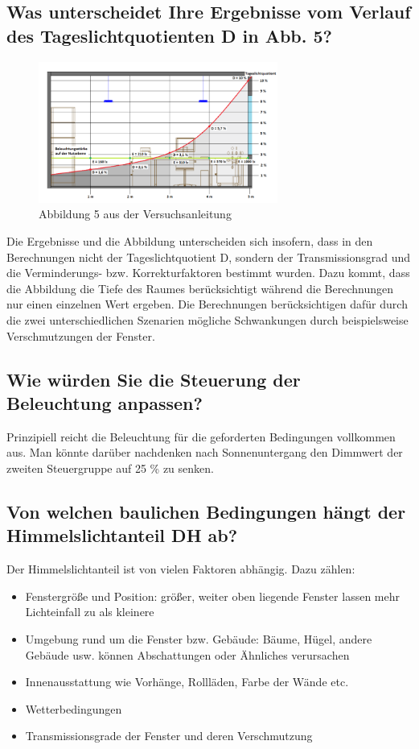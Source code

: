 \subsection{Was unterscheidet Ihre Ergebnisse vom Verlauf des Tageslichtquotienten D in Abb. 5?}


\begin{figure}[H]
    \centering
    \includegraphics[width=0.7\textwidth]{Abbildungen/abb5.png}
    \caption{Abbildung 5 aus der Versuchsanleitung }
    \label{fig:abb5}
\end{figure}

Die Ergebnisse und die Abbildung unterscheiden sich insofern, dass in den Berechnungen nicht der Tageslichtquotient D, sondern der Transmissionsgrad und die Verminderungs- bzw. Korrekturfaktoren bestimmt wurden.
Dazu kommt, dass die Abbildung die Tiefe des Raumes berücksichtigt während die Berechnungen nur einen einzelnen Wert ergeben. 
Die Berechnungen berücksichtigen dafür durch die zwei unterschiedlichen Szenarien mögliche Schwankungen durch beispielsweise Verschmutzungen der Fenster.

\subsection{Wie würden Sie die Steuerung der Beleuchtung anpassen?}

Prinzipiell reicht die Beleuchtung für die geforderten Bedingungen vollkommen aus.
Man könnte darüber nachdenken nach Sonnenuntergang den Dimmwert der zweiten Steuergruppe auf 25 \% zu senken.



\subsection{Von welchen baulichen Bedingungen hängt der Himmelslichtanteil DH ab?}

Der Himmelslichtanteil ist von vielen Faktoren abhängig. Dazu zählen:
\begin{itemize}
\item Fenstergröße und Position: größer, weiter oben liegende Fenster lassen mehr Lichteinfall zu als kleinere
\item Umgebung rund um die Fenster bzw. Gebäude: Bäume, Hügel, andere Gebäude usw. können Abschattungen oder Ähnliches verursachen
\item Innenausstattung wie Vorhänge, Rollläden, Farbe der Wände etc. 
\item Wetterbedingungen
\item Transmissionsgrade der Fenster und deren Verschmutzung

\end{itemize}

